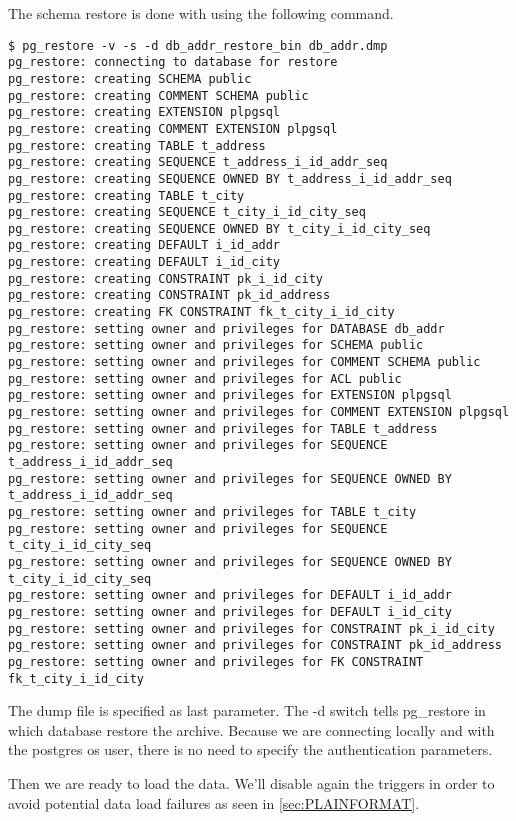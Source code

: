 The schema restore is done with using the following command.

\begin{verbatim}
$ pg_restore -v -s -d db_addr_restore_bin db_addr.dmp
pg_restore: connecting to database for restore
pg_restore: creating SCHEMA public
pg_restore: creating COMMENT SCHEMA public
pg_restore: creating EXTENSION plpgsql
pg_restore: creating COMMENT EXTENSION plpgsql
pg_restore: creating TABLE t_address
pg_restore: creating SEQUENCE t_address_i_id_addr_seq
pg_restore: creating SEQUENCE OWNED BY t_address_i_id_addr_seq
pg_restore: creating TABLE t_city
pg_restore: creating SEQUENCE t_city_i_id_city_seq
pg_restore: creating SEQUENCE OWNED BY t_city_i_id_city_seq
pg_restore: creating DEFAULT i_id_addr
pg_restore: creating DEFAULT i_id_city
pg_restore: creating CONSTRAINT pk_i_id_city
pg_restore: creating CONSTRAINT pk_id_address
pg_restore: creating FK CONSTRAINT fk_t_city_i_id_city
pg_restore: setting owner and privileges for DATABASE db_addr
pg_restore: setting owner and privileges for SCHEMA public
pg_restore: setting owner and privileges for COMMENT SCHEMA public
pg_restore: setting owner and privileges for ACL public
pg_restore: setting owner and privileges for EXTENSION plpgsql
pg_restore: setting owner and privileges for COMMENT EXTENSION plpgsql
pg_restore: setting owner and privileges for TABLE t_address
pg_restore: setting owner and privileges for SEQUENCE t_address_i_id_addr_seq
pg_restore: setting owner and privileges for SEQUENCE OWNED BY t_address_i_id_addr_seq
pg_restore: setting owner and privileges for TABLE t_city
pg_restore: setting owner and privileges for SEQUENCE t_city_i_id_city_seq
pg_restore: setting owner and privileges for SEQUENCE OWNED BY t_city_i_id_city_seq
pg_restore: setting owner and privileges for DEFAULT i_id_addr
pg_restore: setting owner and privileges for DEFAULT i_id_city
pg_restore: setting owner and privileges for CONSTRAINT pk_i_id_city
pg_restore: setting owner and privileges for CONSTRAINT pk_id_address
pg_restore: setting owner and privileges for FK CONSTRAINT fk_t_city_i_id_city

\end{verbatim}

The dump file is specified as last parameter. The -d switch tells pg\_restore in which database restore
the archive. Because we are connecting locally and with the postgres os user, there is no need to specify
the authentication parameters.\newline

Then we are ready to load the data. We'll disable again the triggers in order to avoid potential data
load failures as seen in \ref{sec:PLAINFORMAT}.

